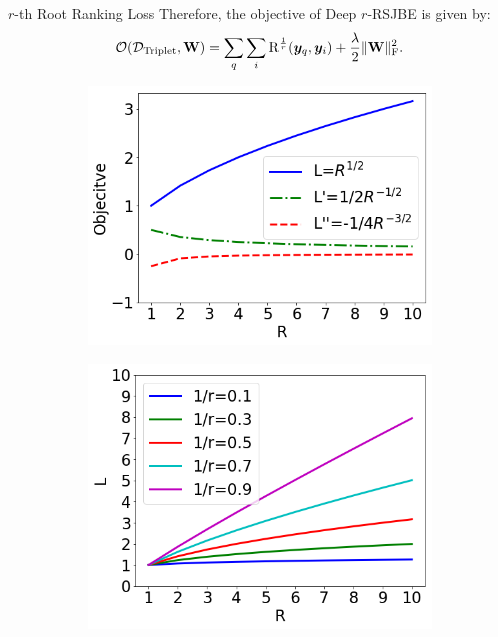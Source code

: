 \documentclass[final]{beamer}
\newlength{\onecolwid}
\newlength{\twocolwid}
\begin{document}
\begin{frame}[t]
\begin{columns}[t]
\begin{column}{\twocolwid}
\begin{columns}[t,totalwidth=\twocolwid]
\begin{column}{\onecolwid}
\begin{block}{$r$-th Root Ranking Loss}
Therefore, the objective of Deep $r$-RSJBE is given by:
\begin{equation}\label{Obj}
\begin{aligned}
\mathcal
{O}(\mathcal{D}_{\rm{Triplet}},\mathbf{W})=\sum_{q}\sum_{i}\mathrm{R}^{\frac{1}{r}}(\bm{y}_{q},\bm{y}_{i})+\frac{\lambda}{2}\|\mathbf{W}\|_{\mathrm{F}}^{2}.
\end{aligned}
\end{equation}
\end{block}
\begin{figure}\vspace{-10mm}
     \begin{subfigure}[t]{0.4\textwidth}
            \includegraphics[width=\textwidth]{fig3a}
            \subcaption{}\label{fig:a}
     \end{subfigure}
     \quad
     \begin{subfigure}[t]{0.4\textwidth}
            \includegraphics[width=\textwidth]{fig3b}

\end{subfigure}
\end{figure}
\end{column}
\end{columns}
\end{column}
\end{columns}
\end{frame}
\end{document}

